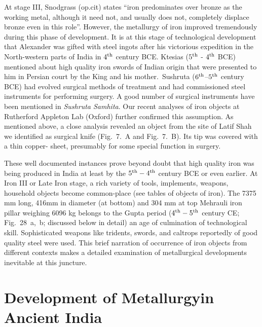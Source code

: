 At stage III, Snodgrass (op.cit) states “iron predominates over bronze as the working metal, although it need not, and usually does not, completely displace bronze even in this role”. However, the metallurgy of iron improved tremendously during this phase of development. It is at this stage of technological development that Alexander was gifted with steel ingots after his victorious expedition in the North-western parts of India in $4^{\rm th}$ century BCE. Ktesias ($5^{\rm th}$ - $4^{\rm th}$ BCE) mentioned about high quality iron swords of Indian origin that were presented to him in Persian court by the King and his mother.~Sushruta ($6^{\rm th}$–$5^{\rm th}$ century BCE) had evolved surgical methods of treatment and had commissioned steel instruments for performing surgery. A good number of surgical instruments have been mentioned in {\it Sushruta Samhita}. Our recent analyses of iron objects at Rutherford Appleton Lab (Oxford) further confirmed this assumption. As mentioned above, a close analysis revealed an object from the site of Latif Shah we identified as surgical knife (Fig.~7.~A and Fig.~7.~B). Its tip was covered with a thin copper- sheet, presumably for some special function in surgery. 

These well documented instances prove beyond doubt that high quality iron was being produced in India at least by the $5^{\rm th} - 4^{\rm th}$ century BCE or even earlier. At Iron III or Late Iron stage, a rich variety of tools, implements, weapons, household objects become common-place (see tables of objects of iron). The 7375 mm long, 416mm in diameter (at bottom) and 304 mm at top Mehrauli iron pillar weighing 6096 kg belongs to the Gupta period ($4^{\rm th}-5^{\rm th}$ century CE; Fig.~28~a,~b; discussed below in detail) an age of culmination of technological skill. Sophisticated weapons like tridents, swords, and caltrops reportedly of good quality steel were used. This brief narration of occurrence of iron objects from different contexts makes a detailed examination of metallurgical developments inevitable at this juncture.

\vspace{-.3cm}

\section*{Development of Metallurgy\hfill \break in Ancient India}\label{section-1}

